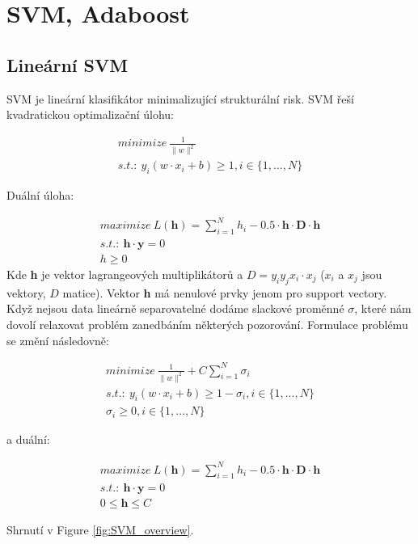 \documentclass{article}
\begin{document}
\section{SVM, Adaboost}
\subsection{Lineární SVM}
SVM je lineární klasifikátor minimalizující strukturální risk. SVM řeší kvadratickou optimalizační úlohu:

\begin{gather}
minimize \  \frac{1}{\|w\| ^2}\\
s.t.:\ y_i(w\cdot  x_i + b) \geq 1, i \in \{1, ..., N\} 
\end{gather}

Duální úloha: 

\begin{gather}
maximize \  L(\textbf{h}) = \displaystyle\sum_{i = 1}^N h_i - 0.5 \cdot \textbf{h} \cdot \textbf{D} \cdot \textbf{h}\\
s.t.:\ \textbf{h} \cdot \textbf{y} = 0\\
h \geq 0
\end{gather}
Kde \textbf{h} je vektor lagrangeových multiplikátorů a $D = y_i y_j x_i\cdot x_j$ ($x_i$ a $x_j$ jsou vektory, $D$ matice). Vektor \textbf{h} má nenulové prvky jenom pro support vectory.\\

Když nejsou data lineárně separovatelné dodáme slackové proměnné $\sigma$, které nám dovolí relaxovat problém zanedbáním některých pozorování. Formulace problému se změní následovně: 

\begin{gather}
minimize \  \displaystyle\frac{1}{\|w\| ^2} + C\sum_{i=1}^N\sigma_i \\
s.t.:\ y_i(w\cdot  x_i + b) \geq 1 - \sigma_i , i \in \{1, ..., N\}\\
\sigma_i \geq 0 , i \in \{1, ..., N\}
\end{gather}

a duální:

\begin{gather}
maximize \  L(\textbf{h}) = \displaystyle\sum_{i = 1}^N h_i - 0.5 \cdot \textbf{h} \cdot \textbf{D} \cdot \textbf{h}\\
s.t.:\ \textbf{h} \cdot \textbf{y} = 0\\
 0 \leq \textbf{h} \leq C
\end{gather}

Shrnutí v Figure \ref{fig:SVM_overview}.
\end{document}
